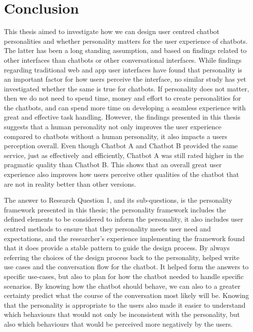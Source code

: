 \chapter{Conclusion}
\label{chap:conclusion}

This thesis aimed to investigate how we can design user centred chatbot personalities and whether personality matters for the user experience of chatbots. The latter has been a long standing assumption, and based on findings related to other interfaces than chatbots or other conversational interfaces. While findings regarding traditional web and app user interfaces have found that personality is an important factor for how users perceive the interface, no similar study has yet investigated whether the same is true for chatbots. If personality does not matter, then we do not need to spend time, money and effort to create personalities for the chatbots, and can spend more time on developing a seamless experience with great and effective task handling. However, the findings presented in this thesis suggests that a human personality not only improves the user experience compared to chatbots without a human personality, it also impacts a users perception overall. Even though Chatbot A and Chatbot B provided the same service, just as effectively and efficiently, Chatbot A was still rated higher in the pragmatic quality than Chatbot B. This shows that an overall great user experience also improves how users perceive other qualities of the chatbot that are not in reality better than other versions.

The answer to Research Question 1, and its sub-questions, is the personality framework presented in this thesis; the personality framework includes the defined elements to be considered to inform the personality, it also includes user centred methods to ensure that they personality meets user need and expectations, and the researcher's experience implementing the framework found that it does provide a stable pattern to guide the design process. By always referring the choices of the design process back to the personality, helped write use cases and the conversation flow for the chatbot. It helped form the answers to specific use-cases, but also to plan for how the chatbot needed to handle specific scenarios. By knowing how the chatbot should behave, we can also to a greater certainty predict what the course of the conversation most likely will be. Knowing that the personality is appropriate to the users also made it easier to understand which behaviours that would not only be inconsistent with the personality, but also which behaviours that would be perceived more negatively by the users.

